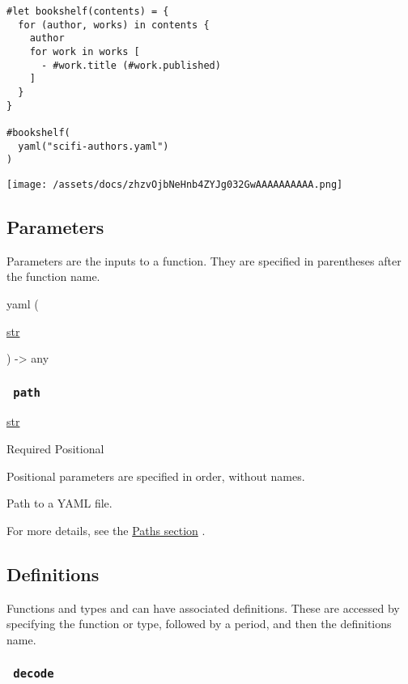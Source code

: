 \begin{verbatim}
#let bookshelf(contents) = {
  for (author, works) in contents {
    author
    for work in works [
      - #work.title (#work.published)
    ]
  }
}

#bookshelf(
  yaml("scifi-authors.yaml")
)
\end{verbatim}

\texttt{[image: /assets/docs/zhzvOjbNeHnb4ZYJg032GwAAAAAAAAAA.png]}

\subsection{\texorpdfstring{{ Parameters
}}{ Parameters }}\label{parameters}

\label{parameters-tooltip}
Parameters are the inputs to a function. They are specified in
parentheses after the function name.

{ yaml } (

{ \href{/docs/reference/foundations/str/}{str} }

) -\textgreater{} { any }

\subsubsection{\texorpdfstring{\texttt{\ path\ }}{ path }}\label{parameters-path}

\href{/docs/reference/foundations/str/}{str}

{Required} {{ Positional }}

\label{parameters-path-positional-tooltip}
Positional parameters are specified in order, without names.

Path to a YAML file.

For more details, see the \href{/docs/reference/syntax/\#paths}{Paths
section} .

\subsection{\texorpdfstring{{ Definitions
}}{ Definitions }}\label{definitions}

\label{definitions-tooltip}
Functions and types and can have associated definitions. These are
accessed by specifying the function or type, followed by a period, and
then the definition\textquotesingle s name.

\subsubsection{\texorpdfstring{\texttt{\ decode\ }}{ decode }}\label{definitions-decode}

